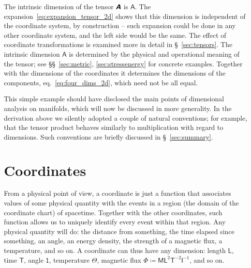 \documentclass[a4paper,12pt,onecolumn,oneside,article,british]{memoir}
\newcommand*{\mathte}[1]{\textbf{\textit{\textsf{#1}}}}
\newcommand*{\defd}{\coloneqq}
\newcommand*{\sect}{\S}%
\newcommand*{\sects}{\S\S}%
\newcommand*{\eqn}{eq.}%
\newcommand*{\Un}{\textsf{1}}
\newcommand*{\Le}{\textsf{L}}
\newcommand*{\Ti}{\textsf{T}}
\newcommand*{\Ma}{\textsf{M}}
\newcommand*{\Te}{\Theta}
\newcommand*{\Cu}{\textsf{I}}
\newcommand*{\Fl}{\Phi}
\newcommand*{\Aa}{\textsf{A}}
\newcommand*{\yA}{\mathte{A}}
\renewcommand*{\i}{\indices}
\begin{document}
The intrinsic dimension of the tensor $\yA$ is $\Aa$. The
expansion~\eqref{eq:expansion_tensor_2d} shows that this dimension is
independent of the coordinate system, by construction -- such expansion
could be done in any other coordinate system, and the left side would be
the same. The effect of coordinate transformations is examined more in
detail in \sect~\ref{sec:tensors}. The intrinsic dimension $\Aa$ is
determined by the physical and operational meaning of the tensor; see
\sects~\ref{sec:metric}, \ref{sec:stressenergy} for concrete examples.
Together with the dimensions of the coordinates it determines the
dimensions of the components, \eqn~\eqref{eq:four_dims_2d}, which need not
be all equal.

This simple example should have disclosed the main points of dimensional
analysis on manifolds, which will now be discussed in more generality.
In the derivation above we silently adopted a couple of natural
conventions; for example, that the tensor product behaves similarly to
multiplication with regard to dimensions. Such conventions are briefly
discussed in \sect~\ref{sec:summary}.





\section{Coordinates}
\label{sec:coords}

From a physical point of view, a coordinate is just a function that
associates values of some physical quantity with the events in a region
(the domain of the coordinate chart) of spacetime. Together with the other
coordinates, such function allows us to uniquely identify every event
within that region. Any physical quantity will do: the distance from
something, the time elapsed since something, an angle, an energy density,
the strength of a magnetic flux, a temperature, and so on. A coordinate can
thus have any dimension: length $\Le$, time $\Ti$, angle $\Un$, temperature
$\Te$, magnetic flux $\Fl \defd \Ma\Le^{2}\Ti^{-2}\Cu^{-1}$, and so on.
\end{document}
